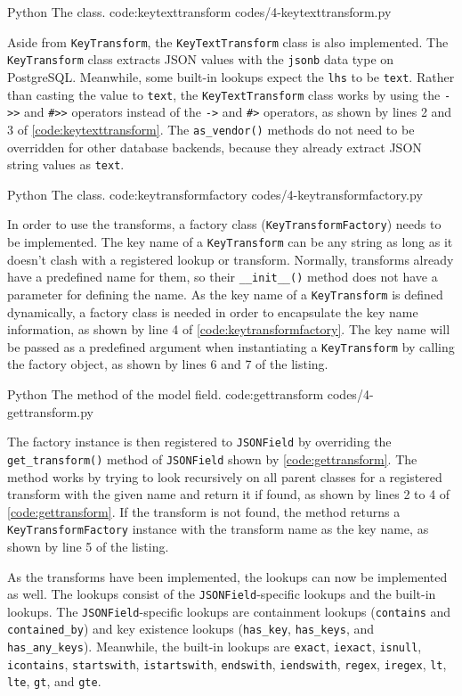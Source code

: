 \listing
{Python}
{The  class.}
{code:keytexttransform}
{codes/4-keytexttransform.py}

Aside from \verb|KeyTransform|, the \verb|KeyTextTransform| class is also
implemented. The \verb|KeyTransform| class extracts JSON values with the
\verb|jsonb| data type on PostgreSQL. Meanwhile, some built-in lookups expect
the \verb|lhs| to be \verb|text|. Rather than casting the value to \verb|text|,
the \verb|KeyTextTransform| class works by using the \verb|->>| and \verb|#>>|
operators instead of the \verb|->| and \verb|#>| operators, as shown by lines 2
and 3 of \autoref{code:keytexttransform}. The \verb|as_vendor()| methods do not
need to be overridden for other database backends, because they already extract
JSON string values as \verb|text|.

\listing
{Python}
{The  class.}
{code:keytransformfactory}
{codes/4-keytransformfactory.py}

In order to use the transforms, a factory class (\verb|KeyTransformFactory|)
needs to be implemented. The key name of a \verb|KeyTransform| can be any
string as long as it doesn't clash with a registered lookup or transform.
Normally, transforms already have a predefined name for them, so their
\verb|__init__()| method does not have a parameter for defining the name. As
the key name of a \verb|KeyTransform| is defined dynamically, a factory class
is needed in order to encapsulate the key name information, as shown by line 4
of \autoref{code:keytransformfactory}. The key name will be passed as a
predefined argument when instantiating a \verb|KeyTransform| by calling the
factory object, as shown by lines 6 and 7 of the listing.

\listing
{Python}
{The  method of the  model field.}
{code:gettransform}
{codes/4-gettransform.py}

The factory instance is then registered to \verb|JSONField| by overriding the
\verb|get_transform()| method of \verb|JSONField| shown by
\autoref{code:gettransform}. The method works by trying to look recursively on
all parent classes for a registered transform with the given name and return it
if found, as shown by lines 2 to 4 of \autoref{code:gettransform}. If the
transform is not found, the method returns a \verb|KeyTransformFactory|
instance with the transform name as the key name, as shown by line 5 of the
listing.

As the transforms have been implemented, the lookups can now be implemented as
well. The lookups consist of the \verb|JSONField|-specific lookups and the
built-in lookups. The \verb|JSONField|-specific lookups are containment lookups
(\verb|contains| and \verb|contained_by|) and key existence lookups
(\verb|has_key|, \verb|has_keys|, and \verb|has_any_keys|). Meanwhile, the
built-in lookups are \verb|exact|, \verb|iexact|, \verb|isnull|,
\verb|icontains|, \verb|startswith|, \verb|istartswith|, \verb|endswith|,
\verb|iendswith|, \verb|regex|, \verb|iregex|, \verb|lt|, \verb|lte|,
\verb|gt|, and \verb|gte|.

